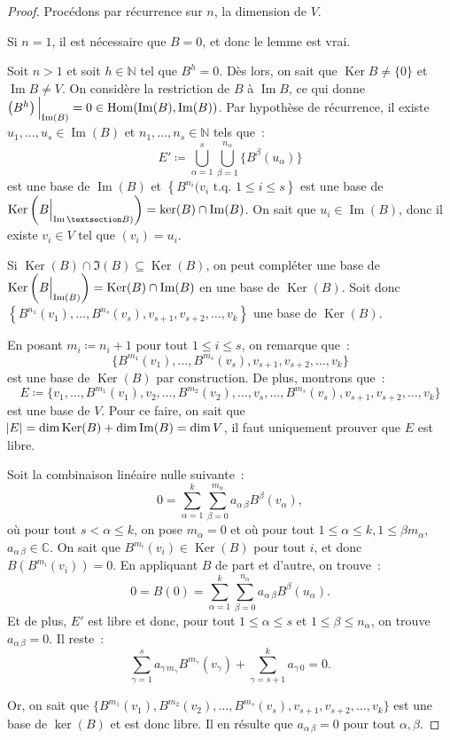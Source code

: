 \documentclass{article}
\DeclareMathOperator{\Ker}{Ker}
\DeclareMathOperator{\Imf}{Im}
\DeclareMathOperator{\Hom}{Hom}
\newcommand{\N}{\mathbb N}
\newcommand{\C}{\mathbb C}
\newcommand{\restr}[2]{ %
	\left.\kern-\nulldelimiterspace %
	#1 %
	\vphantom{\big|} %
	\right|_{#2} %
}
\newcommand{\tq}{\textrm{ t.q. }}
\theoremstyle{definition}
\theoremstyle{remark}
\begin{document}
		\begin{proof} Procédons par récurrence sur $n$, la dimension de $V$.

		Si $n=1$, il est nécessaire que $B = 0$, et donc le lemme est vrai.

		Soit $n > 1$ et soit $h \in \N$ tel que $B^h = 0$. Dès lors, on sait que $\Ker B \neq \{0\}$ et $\Imf B \neq V$. On considère la restriction de $B$ à
		$\Imf B$, ce qui donne $\restr {\left(B^h\right)}{\Imf(B)} = 0 \in \Hom(\Imf(B), \Imf(B))$. Par hypothèse de récurrence, il existe
		$u_1, \dotsc, u_s \in \Imf(B)$ et $n_1, \dotsc, n_s \in \N$ tels que~:
		\[E' \coloneqq \bigcup_{\alpha=1}^s\bigcup_{\beta=1}^{n_\alpha}\{B^\beta(u_\alpha)\}\]
		est une base de $\Imf(B)$ et $\left\{B^{n_i}(v_i \tq 1 \leq i \leq s\right\}$ est une base de $\Ker\left(\restr B{\Imf§B)}\right) = \ker(B) \cap \Imf(B)$.
		On sait que $u_i \in \Imf(B)$, donc il existe $v_i \in V$ tel que $(v_i) = u_i$.

		Si $\Ker(B) \cap \Im(B) \subseteq \Ker(B)$, on peut compléter une base de $\Ker\left(\restr B{\Imf(B)}\right) = \Ker(B) \cap \Imf(B)$ en une base de
		$\Ker(B)$. Soit donc $\left\{B^{n_1}(v_1), \dotsc, B^{n_s}(v_s), v_{s+1}, v_{s+2}, \dotsc, v_k\right\}$ une base de $\Ker(B)$.

		En posant $m_i \coloneqq n_i + 1$ pour tout $1 \leq i \leq s$, on remarque que~:
		\[\{B^{m_1}(v_1), \dotsc, B^{m_s}(v_s), v_{s+1}, v_{s+2}, \dotsc, v_k\}\]
		est une base de $\Ker(B)$ par construction. De plus, montrons que~:
		\[E \coloneqq \{v_1, \dotsc, B^{m_1}(v_1), v_2, \dotsc, B^{m_2}(v_2), \dotsc, v_s, \dotsc, B^{m_s}(v_s), v_{s+1}, v_{s+2}, \dotsc, v_k\}\]
		est une base de $V$. Pour ce faire, on sait que $\abs E = \dim \Ker(B) + \dim \Imf(B) = \dim V$, il faut uniquement prouver que $E$ est libre.

		Soit la combinaison linéaire nulle suivante~:
		\[0 = \sum_{\alpha=1}^k\sum_{\beta=0}^{m_\alpha}a_{\alpha\,\beta}B^\beta(v_\alpha),\]
		où pour tout $s < \alpha \leq k$, on pose $m_\alpha = 0$ et où pour tout $1 \leq \alpha \leq k, 1 \leq \beta m_\alpha$, $a_{\alpha\,\beta} \in \C$.
		On sait que $B^{m_i}(v_i) \in \Ker(B)$ pour tout $i$, et donc $B(B^{m_i}(v_i)) = 0$. En appliquant $B$ de part et d'autre, on trouve~:
		\[0 = B(0) = \sum_{\alpha=1}^k\sum_{\beta=0}^{n_\alpha}a_{\alpha\,\beta}B^\beta(u_\alpha).\]
		Et de plus, $E'$ est libre et donc, pour tout $1 \leq \alpha \leq s$ et $1 \leq \beta \leq n_\alpha$, on trouve $a_{\alpha\,\beta} = 0$. Il reste~:
		\[\sum_{\gamma=1}^sa_{\gamma\,m_\gamma}B^{m_\gamma}(v_\gamma) + \sum_{\gamma=s+1}^ka_{\gamma\,0} = 0.\]

		Or, on sait que $\{B^{m_1}(v_1), B^{m_2}(v_2), \dotsc, B^{m_s}(v_s), v_{s+1}, v_{s+2}, \dots, v_k\}$ est une base de $\ker(B)$ et est donc libre.
		Il en résulte que $a_{\alpha\,\beta} = 0$ pour tout $\alpha, \beta$.
		\end{proof}
\end{document}
